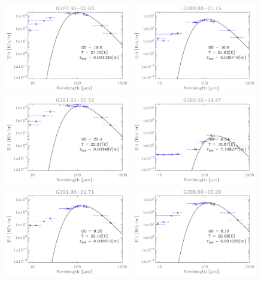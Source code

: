 \begin{figure}
\centering
\includegraphics[trim=-1mm -1mm -1mm -1mm, clip, width=55mm]{appB/appB_72.pdf}
\includegraphics[trim=-1mm -1mm -1mm -1mm, clip, width=55mm]{appB/appB_73.pdf}
\includegraphics[trim=-1mm -1mm -1mm -1mm, clip, width=55mm]{appB/appB_74.pdf}
\includegraphics[trim=-1mm -1mm -1mm -1mm, clip, width=55mm]{appB/appB_75.pdf}
\includegraphics[trim=-1mm -1mm -1mm -1mm, clip, width=55mm]{appB/appB_76.pdf}
\includegraphics[trim=-1mm -1mm -1mm -1mm, clip, width=55mm]{appB/appB_77.pdf}

\end{figure}
